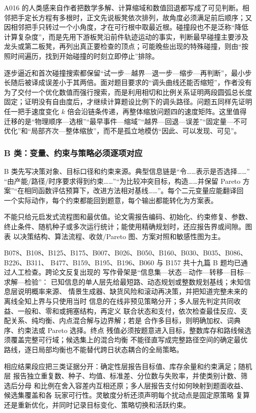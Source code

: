 \documentclass[UTF8,a4paper,12pt]{ctexart}
\begin{document}
A016 的人类感来自作者把数学多解、计算缩域和数值回退都写成了可见判断。相邻把手定长方程有多根时，正文先说板凳依次排列，故角度必须满足前后顺序；又因相邻把手只转过一个小角度，才在可行根中取最近根。碰撞段也不是泛称“降低计算复杂度”，而是先用下游板凳沿前件轨迹运动的事实，判断最早碰撞主要涉及龙头或第二板凳，再列出真正要检查的顶点；可能晚些出现的特殊碰撞，则由“按照时间遍历，找到开始碰撞的时刻立即停止”排除。

逐步逼近和首次碰撞搜索都保留“试一步—越界—退一步—缩步—再判断”，最小步长随后被译成误差小于其两倍。面对题目要求的“调头曲线还能否缩短”，作者没有为了交付一个优化数值而强行搜索，而是利用相切和比例关系证明两段圆弧总长度固定；证明没有自由度后，才继续计算题设比例下的调头路径。问题五同样先证明任一把手速度变化 $k$ 倍会沿链条传递，再整体缩放问题四的速度矩阵。这里值得迁移的是“物理顺序—选根”“最早事件—缩域”“越界—回退—误差”“固定量—不可优化”和“局部齐次—整体缩放”，而不是孤立地模仿“因此、可以发现、可见”。

\subsubsection{B 类：变量、约束与策略必须逐项对应}

B 类先写决策对象、目标口径和约束来源。典型信息链是“令……表示是否选择……”
“由产能/路径/时序要求得到约束……”“为比较冲突目标，构造……并保留 Pareto
方案”“在相同函数评估预算下，改进方法相对基线……”。每个二元变量应能翻译回
一个实际动作，每个约束都能回到题意，每个输出都能转化为方案表。

不能只给元启发式流程图和最优值。论文需报告编码、初始化、约束修复、参数、
终止条件、随机种子或多次运行统计；能使用精确规划时，还应报告界或间隙。图表
以决策结构、算法流程、收敛/Pareto 图、方案对照和敏感性图为主。

B078、B108、B125、B175、B007、B026、B050、B160、B030、B035、B086、B226、B311、
B477、B159、B195、B196、B060 与 B157 共十九篇 B 题均已通过人工检查。跨论文反复出现的
写作骨架是“信息集—状态—动作—转移—目标—求解—检验”：
已知信息的单人层先给最短路、动态规划或整数规划基线；未知信息层说明概率来源、
情景生成器、缺货风险和滚动再决策，并把知道完整未来的离线全知上界与只使用当时
信息的在线非预见策略分开；多人层先判定共同收益、一般和、零和或拥塞结构，再定义
联合状态和支付，依次检查最佳反应、支配关系、纯均衡、内点混合解与边界解；若是
合作多目标，则明确加权、词典序、约束法或 Pareto 选择。终点
残值必须按题意进入目标，整数库存和路线候选须覆盖完整可行域；候选集上的混合均衡
不能径直写成完整路径空间的确定最优路线，逐日局部均衡也不能替代跨日状态耦合的全局策略。

相应结果段应把三类证据分开：确定性层报告目标值、库存余量和约束满足；随机层
报告独立重复数、种子、均值、标准差、分位数与失败率，并使类别计数、筛选后分母
和比例在舍入容差内互相还原；多人层报告支付如何映射到题面收益、候选集覆盖和各
玩家可行性。灵敏度分析还须声明每个扰动点是固定原策略
复算还是重新优化，并同时记录目标变化、策略切换和活跃约束。
\end{document}
